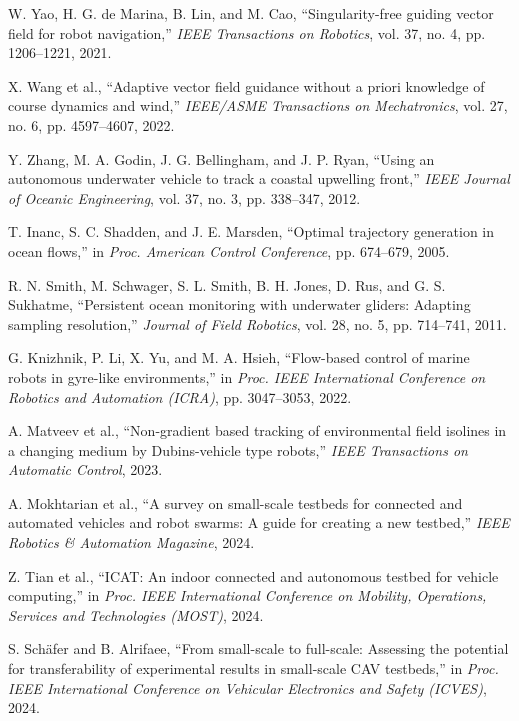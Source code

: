  W. Yao, H. G. de Marina, B. Lin, and M. Cao, ``Singularity-free guiding vector field for robot navigation,'' \textit{IEEE Transactions on Robotics}, vol. 37, no. 4, pp. 1206--1221, 2021.

 X. Wang et al., ``Adaptive vector field guidance without a priori knowledge of course dynamics and wind,'' \textit{IEEE/ASME Transactions on Mechatronics}, vol. 27, no. 6, pp. 4597--4607, 2022.

 Y. Zhang, M. A. Godin, J. G. Bellingham, and J. P. Ryan, ``Using an autonomous underwater vehicle to track a coastal upwelling front,'' \textit{IEEE Journal of Oceanic Engineering}, vol. 37, no. 3, pp. 338--347, 2012.

 T. Inanc, S. C. Shadden, and J. E. Marsden, ``Optimal trajectory generation in ocean flows,'' in \textit{Proc. American Control Conference}, pp. 674--679, 2005.

 R. N. Smith, M. Schwager, S. L. Smith, B. H. Jones, D. Rus, and G. S. Sukhatme, ``Persistent ocean monitoring with underwater gliders: Adapting sampling resolution,'' \textit{Journal of Field Robotics}, vol. 28, no. 5, pp. 714--741, 2011.

 G. Knizhnik, P. Li, X. Yu, and M. A. Hsieh, ``Flow-based control of marine robots in gyre-like environments,'' in \textit{Proc. IEEE International Conference on Robotics and Automation (ICRA)}, pp. 3047--3053, 2022.

 A. Matveev et al., ``Non-gradient based tracking of environmental field isolines in a changing medium by Dubins-vehicle type robots,'' \textit{IEEE Transactions on Automatic Control}, 2023.

 A. Mokhtarian et al., ``A survey on small-scale testbeds for connected and automated vehicles and robot swarms: A guide for creating a new testbed,'' \textit{IEEE Robotics \& Automation Magazine}, 2024.

 Z. Tian et al., ``ICAT: An indoor connected and autonomous testbed for vehicle computing,'' in \textit{Proc. IEEE International Conference on Mobility, Operations, Services and Technologies (MOST)}, 2024.

 S. Schäfer and B. Alrifaee, ``From small-scale to full-scale: Assessing the potential for transferability of experimental results in small-scale CAV testbeds,'' in \textit{Proc. IEEE International Conference on Vehicular Electronics and Safety (ICVES)}, 2024.


